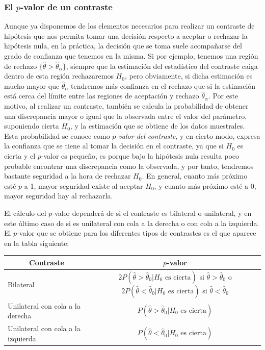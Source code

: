 \subsubsection{El $p$-valor de un contraste}
Aunque ya disponemos de los elementos necesarios para realizar un contraste de
hipótesis que nos permita tomar una decisión respecto a aceptar o rechazar la
hipótesis nula, en la práctica, la decisión que se toma suele acompañarse del
grado de confianza que tenemos en la misma. Si por ejemplo, tenemos una región
de rechazo $\{\hat{\theta}>\hat{\theta}_\alpha\}$, siempre que la estimación
del estadístico del contraste caiga dentro de esta región rechazaremos $H_0$,
pero obviamente, si dicha estimación es mucho mayor que $\hat{\theta}_\alpha$
tendremos más confianza en el rechazo que si la estimación está cerca del
límite entre las regiones de aceptación y rechazo $\hat{\theta}_\alpha$. Por
este motivo, al realizar un contraste, también se calcula la probabilidad de
obtener una discrepancia mayor o igual que la observada entre el valor del
parámetro, suponiendo cierta $H_0$, y la estimación que se obtiene de los datos
muestrales. Esta probabilidad se conoce como  \emph{$p$-valor del contraste},
y en cierto modo, expresa la confianza que se tiene al tomar la decisión en el
contraste, ya que si $H_0$ es cierta y el $p$-valor es pequeño, es porque
bajo la hipótesis nula resulta poco probable encontrar una discrepancia como la
observada, y por tanto, tendremos bastante seguridad a la hora de rechazar
$H_0$. En general, cuanto más próximo esté $p$ a 1, mayor seguridad existe al
aceptar $H_0$, y cuanto más próximo esté a 0, mayor seguridad hay al
rechazarla.

El cálculo del $p$-valor dependerá de si el contraste es bilateral o
unilateral, y en este último caso de si es unilateral con cola a la derecha o
con cola a la izquierda. El $p$-valor que se obtiene para los diferentes tipos
de contrastes es el que aparece en la tabla siguiente:

\begin{center}
\renewcommand{\arraystretch}{1.2}
\begin{tabular}{|l|c|}
\hline
\multicolumn{1}{|c|}{Contraste} & $p$-valor \\
\hline
Bilateral & \multicolumn{1}{p{5.5cm}|}{$2P(\hat\theta>\hat\theta_0|H_0\textrm{ es cierta})$ si $\hat\theta>\hat\theta_0$ \textrm{ o}\newline $2P(\hat\theta<\hat\theta_0|H_0\textrm{ es cierta})$ si $\hat\theta<\hat\theta_0$} \\
\hline
Unilateral con cola a la derecha & $P(\hat\theta>\hat\theta _0|H_0\textrm{ es cierta})$ \\
\hline
Unilateral con cola a la izquierda & $P( \hat\theta  < \hat\theta _0|H_0\textrm{ es cierta})$ \\
\hline
\end{tabular}
\end{center}

